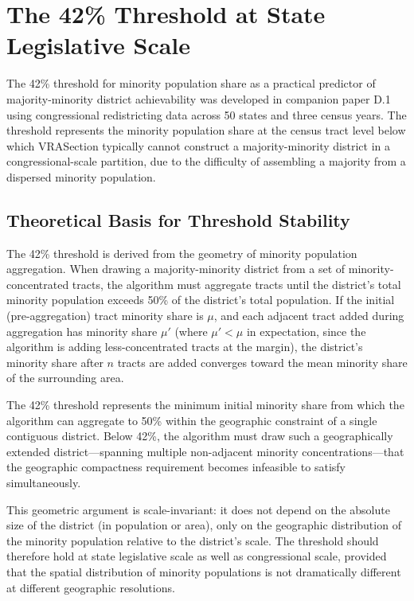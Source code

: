 \section{The 42\% Threshold at State Legislative Scale}
\label{sec:threshold}

The 42\% threshold for minority population share as a practical predictor of majority-minority district achievability was developed in companion paper D.1 \citep{dellaLibera2026threshold} using congressional redistricting data across 50 states and three census years. The threshold represents the minority population share at the census tract level below which VRASection typically cannot construct a majority-minority district in a congressional-scale partition, due to the difficulty of assembling a majority from a dispersed minority population.

\subsection{Theoretical Basis for Threshold Stability}

The 42\% threshold is derived from the geometry of minority population aggregation. When drawing a majority-minority district from a set of minority-concentrated tracts, the algorithm must aggregate tracts until the district's total minority population exceeds 50\% of the district's total population. If the initial (pre-aggregation) tract minority share is $\mu$, and each adjacent tract added during aggregation has minority share $\mu'$ (where $\mu' < \mu$ in expectation, since the algorithm is adding less-concentrated tracts at the margin), the district's minority share after $n$ tracts are added converges toward the mean minority share of the surrounding area.

The 42\% threshold represents the minimum initial minority share from which the algorithm can aggregate to 50\% within the geographic constraint of a single contiguous district. Below 42\%, the algorithm must draw such a geographically extended district---spanning multiple non-adjacent minority concentrations---that the geographic compactness requirement becomes infeasible to satisfy simultaneously.

This geometric argument is scale-invariant: it does not depend on the absolute size of the district (in population or area), only on the geographic distribution of the minority population relative to the district's scale. The threshold should therefore hold at state legislative scale as well as congressional scale, provided that the spatial distribution of minority populations is not dramatically different at different geographic resolutions.

